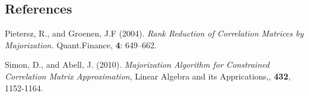 \documentclass[12pt]{article}
\begin{document}
%        
%
%        

\subsection*{References}

\begin{description}

\item
Pietersz, R., and Groenen, J.F (2004).
\textit{Rank Reduction of Correlation Matrices by Majorization.}
Quant.Finance, {\bf 4}: 649--662.

\item
Simon, D., and Abell, J. (2010).
\textit{Majorization Algorithm for Constrained Correlation Matrix Approximation},
Linear Algebra and its Apprications,, {\bf 432}, 1152-1164.

\end{description}
\end{document}
